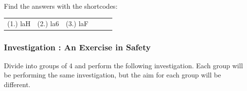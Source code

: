\label{m38791*secfhsst!!!underscore!!!id1289}
\par {} Find the answers with the shortcodes:
 \par \begin{tabular}[h]{cccccc}
 (1.) laH  &  (2.) la6  &  (3.) laF  & \end{tabular}
            \subsubsection{  Investigation : An Exercise in Safety }
            \nopagebreak
        \label{m38791*id67213}Divide into groups of 4 and perform the following investigation. Each group will be performing the same investigation, but the aim for each group will be different.\par 
